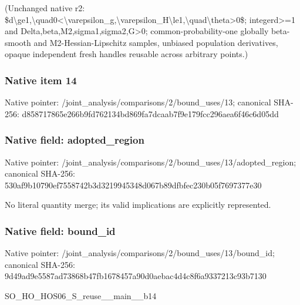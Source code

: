 \documentclass[10pt,a4paper]{article}
\begin{document}
\begingroup\raggedright\sloppy (Unchanged native r2:\allowbreak{} \$d\textbackslash{}ge1,\allowbreak{}\textbackslash{}quad0<\textbackslash{}varepsilon\_\allowbreak{}g,\allowbreak{}\textbackslash{}varepsilon\_\allowbreak{}H\textbackslash{}le1,\allowbreak{}\textbackslash{}quad\textbackslash{}theta>0\$;\allowbreak{} integerd>=\allowbreak{}1 and Delta,\allowbreak{}beta,\allowbreak{}M2,\allowbreak{}sigma1,\allowbreak{}sigma2,\allowbreak{}G>0;\allowbreak{} common-probability-one globally beta-smooth and M2-Hessian-Lipschitz samples,\allowbreak{} unbiased population derivatives,\allowbreak{} opaque independent fresh handles reusable across arbitrary points.)\par\endgroup

\subsubsection{Native item 14}
Native pointer: /joint\_\allowbreak{}analysis/comparisons/2/bound\_\allowbreak{}uses/13; canonical SHA-256: d858717865e266b9fd762134bd869fa7dcaab7f9e179fcc296aea6f46c6d05dd

\subsubsection{Native field: adopted\_\allowbreak{}region}
Native pointer: /joint\_\allowbreak{}analysis/comparisons/2/bound\_\allowbreak{}uses/13/adopted\_\allowbreak{}region; canonical SHA-256: 530af9b10790ef7558742b3d3219945348d067b89dfbfec230b05f7697377e30

\begingroup\raggedright\sloppy No literal quantity merge;\allowbreak{} its valid implications are explicitly represented.\par\endgroup

\subsubsection{Native field: bound\_\allowbreak{}id}
Native pointer: /joint\_\allowbreak{}analysis/comparisons/2/bound\_\allowbreak{}uses/13/bound\_\allowbreak{}id; canonical SHA-256: 9d49ad9e5587ad73868b47fb1678457a90d0aebac4d4c8f6a9337213c93b7130

\begingroup\raggedright\sloppy SO\_\allowbreak{}HO\_\allowbreak{}HOS06\_\allowbreak{}S\_\allowbreak{}reuse\_\allowbreak{}\_\allowbreak{}main\_\allowbreak{}\_\allowbreak{}b14\par\endgroup
\end{document}
